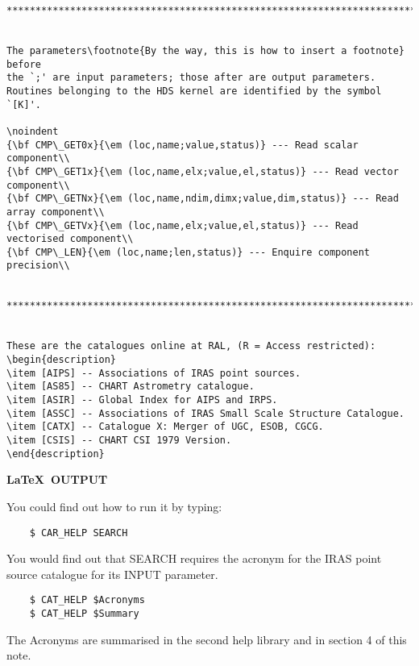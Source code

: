 \begin{verbatim}
********************************************************************************


The parameters\footnote{By the way, this is how to insert a footnote} before
the `;' are input parameters; those after are output parameters.
Routines belonging to the HDS kernel are identified by the symbol `[K]'.

\noindent
{\bf CMP\_GET0x}{\em (loc,name;value,status)} --- Read scalar component\\
{\bf CMP\_GET1x}{\em (loc,name,elx;value,el,status)} --- Read vector component\\
{\bf CMP\_GETNx}{\em (loc,name,ndim,dimx;value,dim,status)} --- Read array component\\
{\bf CMP\_GETVx}{\em (loc,name,elx;value,el,status)} --- Read vectorised component\\
{\bf CMP\_LEN}{\em (loc,name;len,status)} --- Enquire component precision\\


********************************************************************************


These are the catalogues online at RAL, (R = Access restricted):
\begin{description}
\item [AIPS] -- Associations of IRAS point sources.
\item [AS85] -- CHART Astrometry catalogue.
\item [ASIR] -- Global Index for AIPS and IRPS.
\item [ASSC] -- Associations of IRAS Small Scale Structure Catalogue.
\item [CATX] -- Catalogue X: Merger of UGC, ESOB, CGCG.
\item [CSIS] -- CHART CSI 1979 Version.
\end{description}
\end{verbatim}

\newpage

\begin{center}
{\bf \LaTeX\ OUTPUT}
\end{center}

You could find out how to run it by typing:
\begin{verbatim}
    $ CAR_HELP SEARCH
\end{verbatim}
You would find out that SEARCH requires the acronym for the IRAS point source
catalogue for its INPUT parameter.
\begin{verbatim}
    $ CAT_HELP $Acronyms
    $ CAT_HELP $Summary
\end{verbatim}
The Acronyms are summarised in the second help library and in section 4 of this
note.

